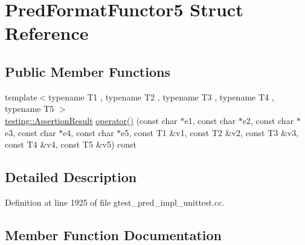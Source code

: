 \hypertarget{struct_pred_format_functor5}{}\section{Pred\+Format\+Functor5 Struct Reference}
\label{struct_pred_format_functor5}
\subsection*{Public Member Functions}
\begin{DoxyCompactItemize}
\item 
{\footnotesize template$<$typename T1 , typename T2 , typename T3 , typename T4 , typename T5 $>$ }\\\hyperlink{classtesting_1_1_assertion_result}{testing\+::\+Assertion\+Result} \hyperlink{struct_pred_format_functor5_afbadd6fc310c388477ce0c13aea58b30}{operator()} (const char $\ast$e1, const char $\ast$e2, const char $\ast$e3, const char $\ast$e4, const char $\ast$e5, const T1 \&v1, const T2 \&v2, const T3 \&v3, const T4 \&v4, const T5 \&v5) const 
\end{DoxyCompactItemize}


\subsection{Detailed Description}


Definition at line 1925 of file gtest\+\_\+pred\+\_\+impl\+\_\+unittest.\+cc.



\subsection{Member Function Documentation}
